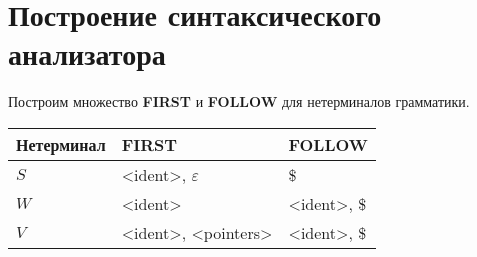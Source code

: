 \section{Построение синтаксического анализатора}

Построим множество \textbf{FIRST} и \textbf{FOLLOW} для нетерминалов грамматики.

\begin{center}
    \begin{tabular}{ | l | l | l | }
        \hline
        \textbf{Нетерминал} & \textbf{FIRST} & \textbf{FOLLOW} \\
        \hline
        $S$ & <ident>, $\varepsilon$ & \$ \\
        \hline
        $W$ & <ident> & <ident>, \$ \\
        \hline
        $V$ & <ident>, <pointers> & <ident>, \$ \\
        \hline
    \end{tabular}
\end{center}
